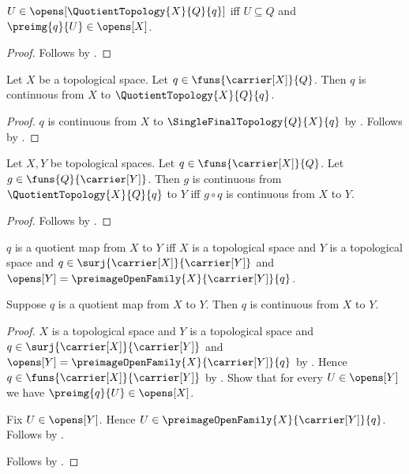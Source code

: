 \begin{proposition}\label{quotient_topology_open_iff}
    $U\in\opens[\QuotientTopology{X}{Q}{q}]$ iff
        $U\subseteq Q$ and $\preimg{q}{U}\in\opens[X]$.
\end{proposition}
\begin{proof}
    Follows by
        .
\end{proof}

\begin{theorem}\label{quotient_topology_structure_map_continuous}
    Let $X$ be a topological space.
    Let $q\in\funs{\carrier[X]}{Q}$.
    Then $q$ is continuous from $X$ to
        $\QuotientTopology{X}{Q}{q}$.
\end{theorem}
\begin{proof}
    $q$ is continuous from $X$ to
        $\SingleFinalTopology{Q}{X}{q}$ by
        .
    Follows by .
\end{proof}

\begin{theorem}\label{quotient_topology_universal_property}
    Let $X,Y$ be topological spaces.
    Let $q\in\funs{\carrier[X]}{Q}$.
    Let $g\in\funs{Q}{\carrier[Y]}$.
    Then $g$ is continuous from $\QuotientTopology{X}{Q}{q}$ to $Y$
        iff $g\circ q$ is continuous from $X$ to $Y$.
\end{theorem}
\begin{proof}
    Follows by
        .
\end{proof}

\begin{definition}\label{quotient_map}
    $q$ is a quotient map from $X$ to $Y$ iff
        $X$ is a topological space and
        $Y$ is a topological space and
        $q\in\surj{\carrier[X]}{\carrier[Y]}$ and
        $\opens[Y]
            =\preimageOpenFamily{X}{\carrier[Y]}{q}$.
\end{definition}

\begin{theorem}\label{quotient_map_is_continuous}
    Suppose $q$ is a quotient map from $X$ to $Y$.
    Then $q$ is continuous from $X$ to $Y$.
\end{theorem}
\begin{proof}
    $X$ is a topological space and $Y$ is a topological space and
        $q\in\surj{\carrier[X]}{\carrier[Y]}$ and
        $\opens[Y]
            =\preimageOpenFamily{X}{\carrier[Y]}{q}$ by
        .
    Hence $q\in\funs{\carrier[X]}{\carrier[Y]}$ by .
    Show that for every $U\in\opens[Y]$ we have
        $\preimg{q}{U}\in\opens[X]$.
    \begin{subproof}
        Fix $U\in\opens[Y]$.
        Hence $U\in\preimageOpenFamily{X}{\carrier[Y]}{q}$.
        Follows by .
    \end{subproof}
    Follows by .
\end{proof}

